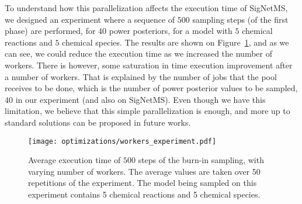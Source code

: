 To understand how this parallelization affects the execution time of
SigNetMS, we designed an experiment where a sequence of $500$ sampling
steps (of the first phase) are performed, for $40$ power posteriors, for
a model with $5$ chemical reactions and $5$ chemical species. The
results are shown on Figure~\ref{fig:parallel_map_sampling},
and as we can see, we could reduce the execution time as we increased
the number of workers. There is however, some saturation in time
execution improvement after a number of workers. That is explained by 
the number of jobs that the pool receives to be done, which is the 
number of power posterior values to be sampled, $40$ in our experiment 
(and also on SigNetMS). Even though we have this limitation, we believe 
that this simple parallelization is enough, and more up to standard 
solutions can be proposed in future works. 

\begin{figure}[t!]
    \begin{center}
    \texttt{[image: optimizations/workers\_experiment.pdf]}
    \caption{Average execution time of $500$ steps of the burn-in
        sampling, with varying number of workers. The average values are
        taken over 50 repetitions of the experiment. The model being
        sampled on this experiment contains 5 chemical reactions and 5
        chemical species.}
    \label{fig:parallel_map_sampling}
    \end{center}
\end{figure}

%
% 

